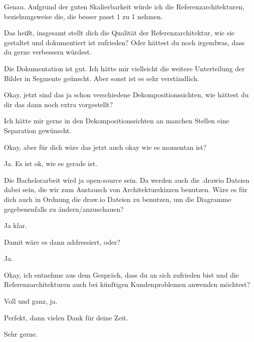 \TVL Genau. Aufgrund der guten Skalierbarkeit würde ich die Referenzarchitekturen, beziehungsweise die, die besser passt 1 zu 1 nehmen.

\LF Das heißt, insgesamt stellt dich die Qualität der Referenzarchitektur, wie sie gestaltet und dokumentiert ist zufrieden? Oder hättest du noch irgendwas, dass du gerne verbessern würdest.

\TVL Die Dokumentation ist gut. Ich hätte mir vielleicht die weitere Unterteilung der Bilder in Segmente geünscht. Aber sonst ist es sehr verständlich.

\LF Okay, jetzt sind das ja schon verschiedene Dekompositionssichten, wie hättest du dir das dann noch extra vorgestellt?

\TVL Ich hätte mir gerne in den Dekompositionssichten an manchen Stellen eine Separation gewünscht.

\LF Okay, aber für dich wäre das jetzt auch okay wie es momentan ist?

\TVL Ja. Es ist ok, wie es gerade ist.

\LF Die Bachelorarbeit wird ja open-source sein. Da werden auch die .drawio Dateien dabei sein, die wir zum Austausch von Architekturskizzen benutzen. Wäre es für dich auch in Ordnung die draw.io Dateien zu benutzen, um die Diagramme gegebenenfalls zu ändern/anzuschauen?

\TVL Ja klar.

\LF Damit wäre es dann addressiert, oder?

\TVL Ja.

\LF Okay, ich entnehme aus dem Gespräch, dass du an sich zufrieden bist und die Referenzarchitekturen auch bei künftigen Kundenproblemen anwenden möchtest?

\TVL Voll und ganz, ja.

\LF Perfekt, dann vielen Dank für deine Zeit.

\TVL Sehr gerne.